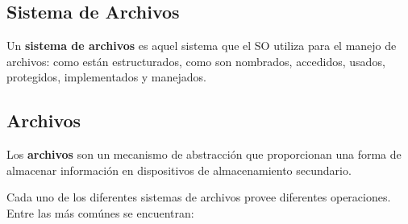 \documentclass[12pt, a4paper]{article} %
\begin{document}
\subsection{Sistema de Archivos}

Un \textbf{sistema de archivos} es aquel sistema que el SO utiliza para el manejo de archivos: como están estructurados, como son nombrados, accedidos, usados, protegidos, implementados y manejados.

\subsection{Archivos}

Los \textbf{archivos} son un mecanismo de abstracción que proporcionan una forma de almacenar información en dispositivos de almacenamiento secundario.

Cada uno de los diferentes sistemas de archivos provee diferentes operaciones. Entre las más comúnes se encuentran:
\end{document}
